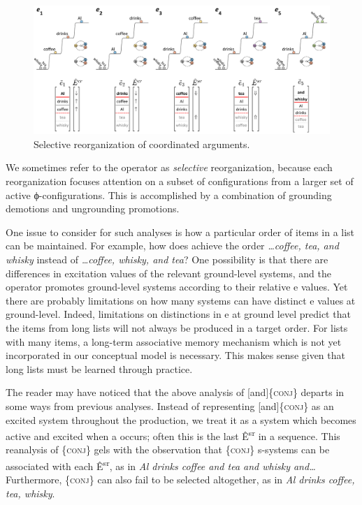   
\begin{figure}
\includegraphics[width=\textwidth]{figures/Tilsen-img99.png}
\caption{Selective reorganization of coordinated arguments.}
\label{fig:4:49}
\end{figure}
   

  We sometimes refer to the  operator as \textit{ selective} reorganization, because each reorganization focuses attention on a subset of configurations from a larger set of active ϕ-con\-fig\-u\-ra\-tions. This is accomplished by a combination of grounding demotions and ungrounding promotions.

  One issue to consider for such analyses is how a particular order of items in a list can be maintained. For example, how does  achieve the order \textit{…coffee, tea, and whisky} instead of \textit{…coffee, whisky, and tea}? One possibility is that there are differences in excitation values of the relevant ground-level systems, and the  operator promotes ground-level systems according to their relative e values. Yet there are probably limitations on how many systems can have distinct e values at ground-level. Indeed, limitations on distinctions in e at ground level predict that the items from long lists will not always be produced in a target order. For lists with many items, a long-term associative memory mechanism which is not yet incorporated in our conceptual model is necessary. This makes sense given that long lists must be learned through practice.

  The reader may have noticed that the above analysis of [and]\{\textsc{conj}\} departs in some ways from previous analyses. Instead of representing [and]\{\textsc{conj}\} as an excited system throughout the production, we treat it as a system which becomes active and excited when a  occurs; often this is the last Ê\textsuperscript{sr} in a sequence. This reanalysis of \{\textsc{conj}\} gels with the observation that \{\textsc{conj}\} s-systems can be associated with each Ê\textsuperscript{sr}, as in \textit{Al drinks coffee and tea and whisky and…} Furthermore, \{\textsc{conj}\} can also fail to be selected altogether, as in \textit{Al drinks coffee, tea, whisky}.

